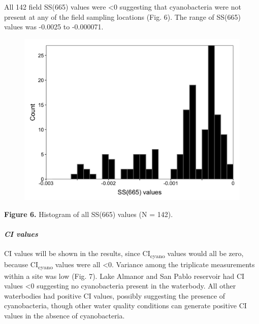\documentclass[]{article}
\let\oldparagraph\paragraph
\renewcommand{\paragraph}[1]{\oldparagraph{#1}\mbox{}}
\begin{document}
All 142 field SS(665) values were \textless{}0 suggesting that
cyanobacteria were not present at any of the field sampling locations
(Fig. 6). The range of SS(665) values was -0.0025 to -0.000071.

\begin{figure}
\includegraphics[width=27.08in]{../Data/Figures_output/ss665_hist} \end{figure}

\textbf{Figure 6.} Histogram of all SS(665) values (N = 142).

\paragraph{\texorpdfstring{\emph{CI
values}}{CI values}}\label{ci-values}

CI values will be shown in the results, since CI\textsubscript{cyano}
values would all be zero, because CI\textsubscript{cyano} values were
all \textless{}0. Variance among the triplicate measurements within a
site was low (Fig. 7). Lake Almanor and San Pablo reservoir had CI
values \textless{}0 suggesting no cyanobacteria present in the
waterbody. All other waterbodies had positive CI values, possibly
suggesting the presence of cyanobacteria, though other water quality
conditions can generate positive CI values in the absence of
cyanobacteria.
\end{document}

